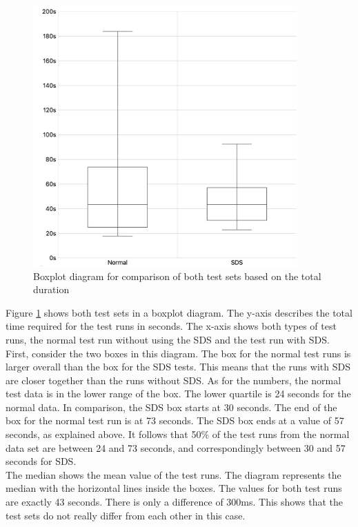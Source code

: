 \begin{figure}[htbp]
    \centerline{
    \includegraphics[height=10cm]{images/box_plot_total_duration.png}}
\caption{Boxplot diagram for comparison of both test sets based on the total duration}
\label{box_plot_comparison}
\end{figure}
Figure \ref{box_plot_comparison} shows both test sets in a boxplot diagram. The y-axis describes the total time required for the test runs in seconds. The x-axis shows both types of test runs, the normal test run without using the \ac{SDS} and the test run with \ac{SDS}. \\
First, consider the two boxes in this diagram. The box for the normal test runs is larger overall than the box for the \ac{SDS} tests. This means that the runs with \ac{SDS} are closer together than the runs without \ac{SDS}. As for the numbers, the normal test data is in the lower range of the box. The lower quartile is 24 seconds for the normal data. In comparison, the \ac{SDS} box starts at 30 seconds. The end of the box for the normal test run is at 73 seconds. The \ac{SDS} box ends at a value of 57 seconds, as explained above. It follows that 50\% of the test runs from the normal data set are between 24 and 73 seconds, and correspondingly between 30 and 57 seconds for \ac{SDS}. \\
The median shows the mean value of the test runs. The diagram represents the median with the horizontal lines inside the boxes. The values for both test runs are exactly 43 seconds. There is only a difference of 300ms. This shows that the test sets do not really differ from each other in this case. \\
